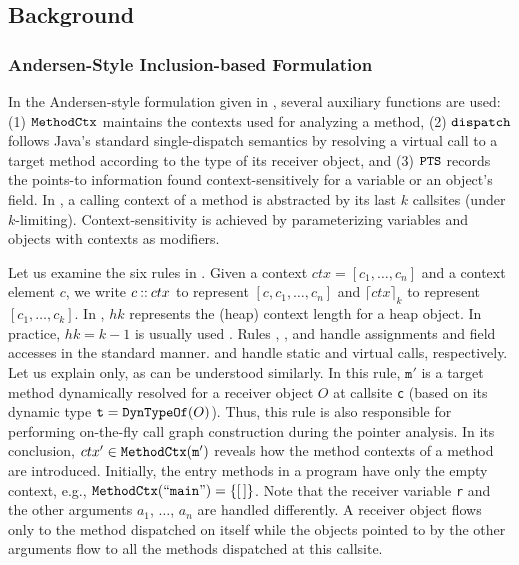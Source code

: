 \subsection{Background}
\label{subsec:background}

\subsubsection{Andersen-Style Inclusion-based Formulation}
\label{subsubsec:inclusion}


In the Andersen-style \cite{andersen1994program} formulation 
\cite{kastrinis2013hybrid, thiessen2017context} given in ,
several auxiliary functions are used:
(1) $\texttt{MethodCtx}$ maintains the contexts used for analyzing a method, 
(2) $\texttt{dispatch}$ follows Java's standard single-dispatch semantics by  resolving a virtual call to a target method according to the type of its receiver object, and 
(3) $\texttt{PTS}$ records the points-to information found context-sensitively for a variable or an object's field. 
In , a calling
context of a method is abstracted by its last $k$ callsites (under $k$-limiting). Context-sensitivity is achieved by parameterizing  variables and objects with
contexts as modifiers.


Let us examine the six rules in
. Given a context $ctx = [c_1, \dots, c_n] $ and a context element $c$,  we write  $c \mathbin{::} ctx$
to represent $[c, c_1, \dots, c_n]$ and   $\lceil ctx \rceil _k$ to represent $[c_1, \dots, c_k]$.
In , $hk$ represents the (heap)  context length for
a heap object. In practice, $hk=k-1$ is usually used \cite{ tan2017efficient, jeon2018precise, li2020principled}.
Rules , , and  handle assignments and field accesses in the standard manner.   and  handle
static and  virtual calls, respectively. Let us explain  only, as  can be
understood similarly.
In this rule, $\texttt{m}'$ is a target method dynamically resolved for a receiver object $O$
at callsite \texttt{c}
(based on its dynamic type $\texttt{t}=\texttt{DynTypeOf}(O)$). Thus,
this rule is also responsible for performing on-the-fly call graph construction during the
pointer analysis.
In its conclusion, $ctx' \in \texttt{MethodCtx}(\texttt{m}')$ reveals how the method contexts of a method are introduced. Initially, the entry methods in a program have only the empty context, e.g., $ \texttt{MethodCtx}(``\texttt{main}")=\{[\,]\}$. 
Note that the receiver variable \texttt{r} and the other arguments $a_1$, $\dots$, $a_n$ are handled differently. A receiver object  flows only to the method dispatched on itself while the objects pointed to
by the other arguments flow to all the methods dispatched at this callsite. 



